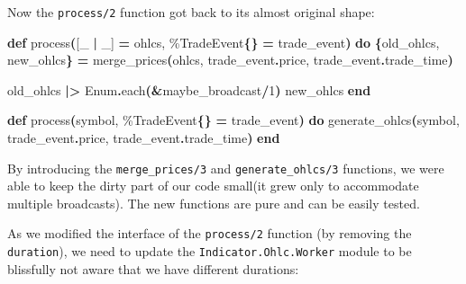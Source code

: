 \documentclass[
  oneside]{book}
\newenvironment{Shaded}{\begin{snugshade}}{\end{snugshade}}
\newcommand{\ConstantTok}[1]{\textcolor[rgb]{0.56,0.35,0.01}{#1}}
\newcommand{\DecValTok}[1]{\textcolor[rgb]{0.00,0.00,0.81}{#1}}
\newcommand{\FunctionTok}[1]{\textcolor[rgb]{0.13,0.29,0.53}{\textbf{#1}}}
\newcommand{\KeywordTok}[1]{\textcolor[rgb]{0.13,0.29,0.53}{\textbf{#1}}}
\newcommand{\NormalTok}[1]{#1}
\newcommand{\OperatorTok}[1]{\textcolor[rgb]{0.81,0.36,0.00}{\textbf{#1}}}
\newcommand{\OtherTok}[1]{\textcolor[rgb]{0.56,0.35,0.01}{#1}}
\begin{document}
Now the \texttt{process/2} function got back to its almost original shape:

\begin{Shaded}
\begin{Highlighting}[]
  \KeywordTok{def}\NormalTok{ process}\FunctionTok{(}\OtherTok{[}\NormalTok{\_ }\OperatorTok{|}\NormalTok{ \_}\OtherTok{]} \OperatorTok{=}\NormalTok{ ohlcs, \%}\ConstantTok{TradeEvent}\FunctionTok{\{\}} \OperatorTok{=}\NormalTok{ trade\_event}\FunctionTok{)} \KeywordTok{do}
    \FunctionTok{\{}\NormalTok{old\_ohlcs, new\_ohlcs}\FunctionTok{\}} \OperatorTok{=}\NormalTok{ merge\_prices}\FunctionTok{(}\NormalTok{ohlcs, trade\_event}\OperatorTok{.}\NormalTok{price, trade\_event}\OperatorTok{.}\NormalTok{trade\_time}\FunctionTok{)}

\NormalTok{    old\_ohlcs }\OperatorTok{|\textgreater{}} \ConstantTok{Enum}\OperatorTok{.}\NormalTok{each}\FunctionTok{(}\OperatorTok{\&}\NormalTok{maybe\_broadcast}\OperatorTok{/}\DecValTok{1}\FunctionTok{)}
\NormalTok{    new\_ohlcs}
  \KeywordTok{end}

  \KeywordTok{def}\NormalTok{ process}\FunctionTok{(}\NormalTok{symbol, \%}\ConstantTok{TradeEvent}\FunctionTok{\{\}} \OperatorTok{=}\NormalTok{ trade\_event}\FunctionTok{)} \KeywordTok{do}
\NormalTok{    generate\_ohlcs}\FunctionTok{(}\NormalTok{symbol, trade\_event}\OperatorTok{.}\NormalTok{price, trade\_event}\OperatorTok{.}\NormalTok{trade\_time}\FunctionTok{)}
  \KeywordTok{end}
\end{Highlighting}
\end{Shaded}

By introducing the \texttt{merge\_prices/3} and \texttt{generate\_ohlcs/3} functions, we were able to keep the dirty part of our code small(it grew only to accommodate multiple broadcasts). The new functions are pure and can be easily tested.

As we modified the interface of the \texttt{process/2} function (by removing the \texttt{duration}), we need to update the \texttt{Indicator.Ohlc.Worker} module to be blissfully not aware that we have different durations:
\end{document}
